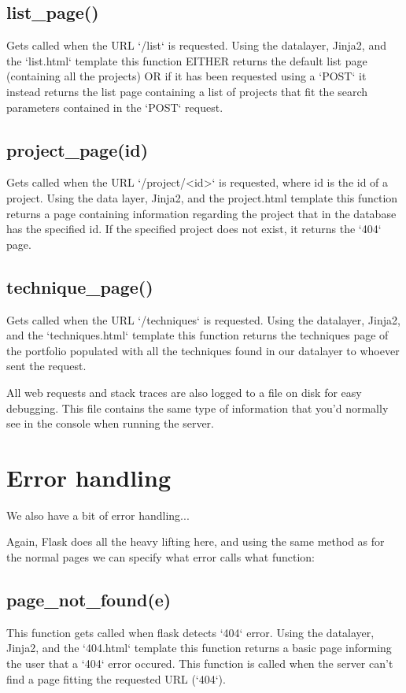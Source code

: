 \documentclass{TDP003mall}
\begin{document}
\subsection{list\_page()} 
Gets called when the URL `/list` is requested. Using the datalayer, Jinja2, and the `list.html` template this function EITHER returns the default list page (containing all the projects) OR if it has been requested using a `POST` it instead returns the list page containing a list of projects that fit the search parameters contained in the `POST` request.

\subsection{project\_page(id)}
Gets called when the URL `/project/<id>` is requested, where id is the id of a project. Using the data layer, Jinja2, and the project.html template this function returns a page containing information regarding the project that in the database has the specified id. If the specified project does not exist, it returns the `404` page.

\subsection{technique\_page()} 
Gets called when the  URL `/techniques` is requested. Using the datalayer, Jinja2, and the `techniques.html` template this function returns the techniques page of the portfolio populated with all the techniques found in our datalayer to whoever sent the request.

All web requests and stack traces are also logged to a file on disk for easy debugging. This file contains the same type of information that you'd normally see in the console when running the server.

\section{Error handling}\label{error-handling}
We also have a bit of error handling...

Again, Flask does all the heavy lifting here, and using the same method as for the normal pages we can specify what error calls what function:

\subsection{page\_not\_found(e)} 
This function gets called when flask detects `404` error. Using the datalayer, Jinja2, and the `404.html` template this function returns a basic page informing the user that a `404` error occured. This function is called when the server can't find a page fitting the requested URL (`404`).
\end{document}

